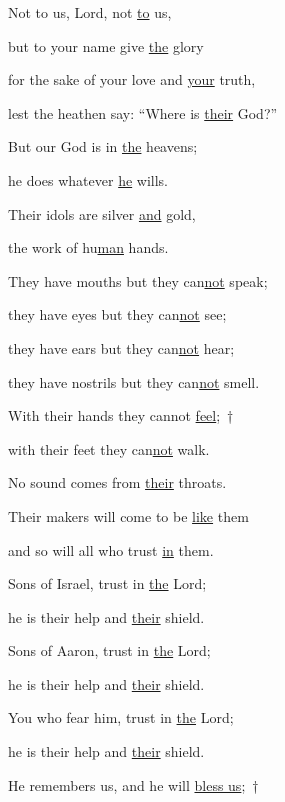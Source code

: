 \noindent Not to us, Lord, not \uline{to} us,~\GreStar{}~\nopagebreak

but to your name give \uline{the} glory

\noindent for the sake of your love and \uline{your} truth,~\GreStar{}~\nopagebreak

lest the heathen say: “Where is \uline{their} God?”



\noindent But our God is in \uline{the} heavens;~\GreStar{}~\nopagebreak

he does whatever \uline{he} wills.

\noindent Their idols are silver \uline{and} gold,~\GreStar{}~\nopagebreak

the work of hu\uline{man} hands.



\noindent They have mouths but they can\uline{not} speak;~\GreStar{}~\nopagebreak

they have eyes but they can\uline{not} see;

\noindent they have ears but they can\uline{not} hear;~\GreStar{}~\nopagebreak

they have nostrils but they can\uline{not} smell.



\noindent With their hands they cannot \uline{feel};~†~\nopagebreak

with their feet they can\uline{not} walk.~\GreStar{}~\nopagebreak

No sound comes from \uline{their} throats.



\noindent Their makers will come to be \uline{like} them~\GreStar{}~\nopagebreak

and so will all who trust \uline{in} them.



\noindent Sons of Israel, trust in \uline{the} Lord;~\GreStar{}~\nopagebreak

he is their help and \uline{their} shield.

\noindent Sons of Aaron, trust in \uline{the} Lord;~\GreStar{}~\nopagebreak

he is their help and \uline{their} shield.



\noindent You who fear him, trust in \uline{the} Lord;~\GreStar{}~\nopagebreak

he is their help and \uline{their} shield.

\noindent He remembers us, and he will \uline{bless us};~†~\nopagebreak

